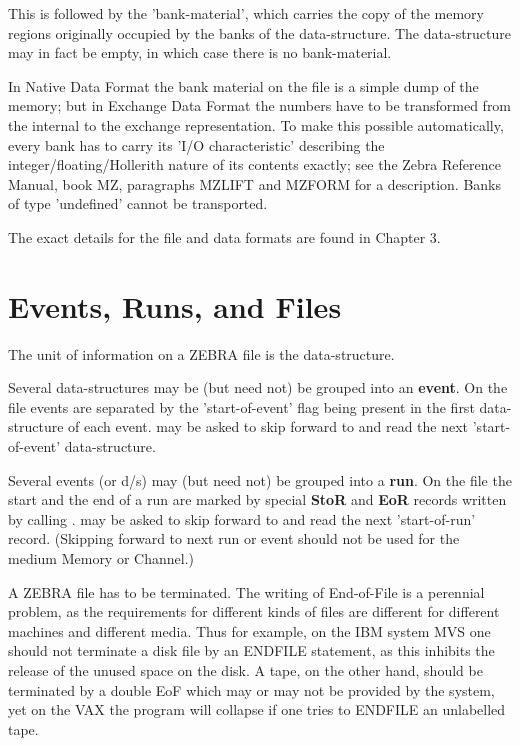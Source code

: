 This is followed by the 'bank-material',
which carries the copy of the memory regions originally occupied
by the banks of the data-structure.
The data-structure may in fact be empty,
in which case there is no bank-material.

In Native Data Format the bank material on the file
is a simple dump of the memory;
but in Exchange Data Format the numbers have to be transformed
from the internal to the exchange representation.
To make this possible automatically,
every bank has to carry its 'I/O characteristic' describing
the integer/floating/Hollerith nature of its contents exactly;
see the Zebra Reference Manual, book MZ, paragraphs MZLIFT
and MZFORM for a description.
Banks of type 'undefined' cannot be transported.

The exact details for the file and data formats
are found in Chapter 3.

\section{Events, Runs, and Files}

The unit of information on a ZEBRA file is the data-structure.

Several data-structures may be (but need not)
be grouped into an \textbf{event}.
On the file events are separated by the 'start-of-event'
flag being present in the first data-structure of each event.
 may be asked to skip forward to and read the next
'start-of-event' data-structure.

Several events (or d/s) may (but need not) be grouped into a
\textbf{run}.
On the file the start and the end of a run are marked by
special \textbf{StoR} and \textbf{EoR} records written by calling .
 may be asked to skip forward to and read the next
'start-of-run' record.
(Skipping forward to next run or event should not be used
for the medium Memory or Channel.)

A ZEBRA file has to be terminated.
The writing of End-of-File is a perennial problem,
as the requirements for different kinds of files are
different for different machines and different media.
Thus for example, on the IBM system MVS one should not terminate
a disk file by an ENDFILE statement,
as this inhibits the release of the unused space on the disk.
A tape, on the other hand,
should be terminated by a double EoF which may or may not be
provided by the system, yet on the VAX the program will collapse
if one tries to ENDFILE an unlabelled tape.

